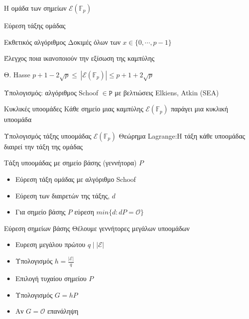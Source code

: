 \documentclass[handout]{beamer}
\begin{document}
\begin{frame}[allowframebreaks]{Η ομάδα των σημείων $\mathcal{E}(\mathbb{F}_p)$}

Εύρεση τάξης ομάδας

\begin{block}{Εκθετικός αλγόριθμος}
Δοκιμές όλων των $x \in \{0, \cdots, p-1\}$

Έλεγχος ποια ικανοποιούν την εξίσωση της καμπύλης
\end{block}
 
\begin{block}{Θ. Hasse}
$ p+1-2\sqrt{p} \leq\ | \mathcal E(\mathbb{F}_p) | \leq p+1+2\sqrt{p}$
\end{block}

Υπολογισμός: αλγόριθμος Schoof $\in \mathtt{P}$ με βελτιώσεις Elkiens, Atkin (SEA)

\framebreak
\begin{block}{Κυκλικές υποομάδες}
Κάθε σημείο μιας καμπύλης $\mathcal{E}(\mathbb{F}_p)$ παράγει μια κυκλική υποομάδα
\end{block}

\begin{block}{Υπολογισμός τάξης υποομάδας $\mathcal{E}(\mathbb{F}_p)$}
Θεώρημα Lagrange:Η τάξη κάθε υποομάδας διαιρεί την τάξη της ομάδας
\end{block}

Τάξη υποομάδας με σημείο βάσης (γεννήτορα) $P$
\begin{itemize}
\item Εύρεση τάξη ομάδας με αλγόριθμο Schoof
\item Εύρεση των διαιρετών της τάξης, $d$
\item Για σημείο βάσης $P$ εύρεση $min \{d: dP = \mathcal{O}\}$
\end{itemize}

\framebreak

\begin{block}{Εύρεση σημείων βάσης}
Θέλουμε γεννήτορες μεγάλων υποομάδων

\begin{itemize}
\item Ευρεση μεγάλου πρώτου $q \mid |\mathcal{E}|$
\item Υπολογισμός $h=\frac{|\mathcal{E}|}{q}$
\item Επιλογή τυχαίου σημείου $P$
\item Υπολογισμός $G = hP$
\item Αν $G = \mathcal{O}$ επανάληψη
\end{itemize}
\end{block}

\end{frame}
\end{document}
